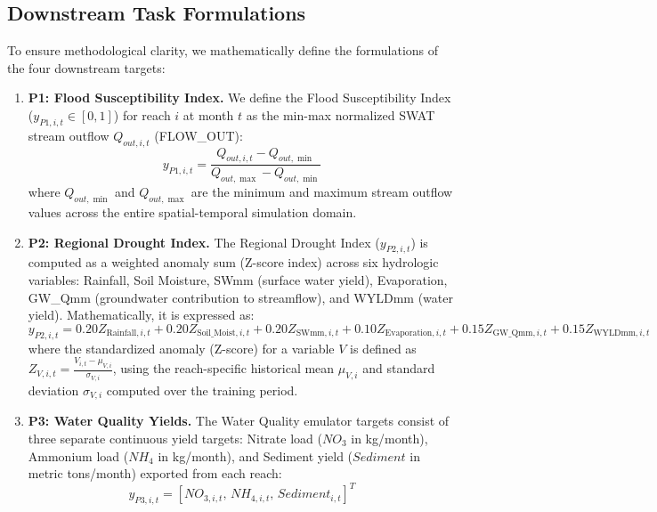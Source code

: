 \documentclass[preprint,12pt]{elsarticle}
\begin{document}
\subsection{Downstream Task Formulations}
To ensure methodological clarity, we mathematically define the formulations of the four downstream targets:
\begin{enumerate}
    \item \textbf{P1: Flood Susceptibility Index.} We define the Flood Susceptibility Index ($y_{P1, i, t} \in [0, 1]$) for reach $i$ at month $t$ as the min-max normalized SWAT stream outflow $Q_{out, i, t}$ (FLOW\_OUT):
    \begin{equation}
    y_{P1, i, t} = \frac{Q_{out, i, t} - Q_{out, \min}}{Q_{out, \max} - Q_{out, \min}}
    \end{equation}
    where $Q_{out, \min}$ and $Q_{out, \max}$ are the minimum and maximum stream outflow values across the entire spatial-temporal simulation domain.
    
    \item \textbf{P2: Regional Drought Index.} The Regional Drought Index ($y_{P2, i, t}$) is computed as a weighted anomaly sum (Z-score index) across six hydrologic variables: Rainfall, Soil Moisture, SWmm (surface water yield), Evaporation, GW\_Qmm (groundwater contribution to streamflow), and WYLDmm (water yield). Mathematically, it is expressed as:
    \begin{equation}
    y_{P2, i, t} = 0.20 Z_{\text{Rainfall}, i, t} + 0.20 Z_{\text{Soil\_Moist}, i, t} + 0.20 Z_{\text{SWmm}, i, t} + 0.10 Z_{\text{Evaporation}, i, t} + 0.15 Z_{\text{GW\_Qmm}, i, t} + 0.15 Z_{\text{WYLDmm}, i, t}
    \end{equation}
    where the standardized anomaly (Z-score) for a variable $V$ is defined as $Z_{V, i, t} = \frac{V_{i,t} - \mu_{V, i}}{\sigma_{V, i}}$, using the reach-specific historical mean $\mu_{V, i}$ and standard deviation $\sigma_{V, i}$ computed over the training period.
    
    \item \textbf{P3: Water Quality Yields.} The Water Quality emulator targets consist of three separate continuous yield targets: Nitrate load ($NO_{3}$ in kg/month), Ammonium load ($NH_{4}$ in kg/month), and Sediment yield ($Sediment$ in metric tons/month) exported from each reach:
    \begin{equation}
    y_{P3, i, t} = [NO_{3, i, t}, \, NH_{4, i, t}, \, Sediment_{i, t}]^T
    \end{equation}
    

\end{enumerate}
\end{document}
